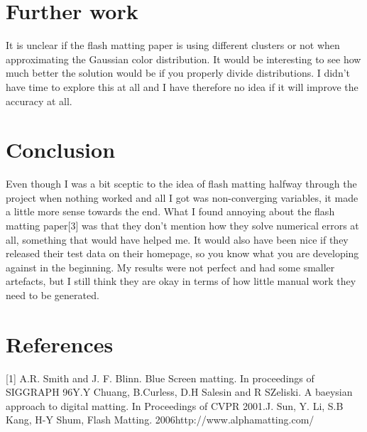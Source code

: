 \documentclass[10pt,letterpaper,twocolumn]{article}
\begin{document}
\section{Further work}
It is unclear if the flash matting paper is using different clusters or not when approximating the Gaussian color distribution. It would be interesting to see how much better the solution would be if you properly divide distributions. I didn't have time to explore this at all and I have therefore no idea if it will improve the accuracy at all.

\section{Conclusion}
Even though I was a bit sceptic to the idea of flash matting halfway through the project when nothing worked and all I got was non-converging variables, it made a little more sense towards the end. What I found annoying about the flash matting paper[3] was that they don't mention how they solve numerical errors at all, something that would have helped me. It would also have been nice if they released their test data on their homepage, so you know what you are developing against in the beginning. My results were not perfect and had some smaller artefacts, but I still think they are okay in terms of how little manual work they need to be generated.

\section{References}
[1] A.R. Smith and J. F. Blinn. Blue Screen matting. In proceedings of SIGGRAPH 96\newline \newline
[2] Y.Y Chuang, B.Curless, D.H Salesin and R SZeliski. A baeysian approach to digital matting. In Proceedings of CVPR 2001.\newline \newline
[3] J. Sun, Y. Li, S.B Kang, H-Y Shum, Flash Matting. 2006\newline \newline
[4] http://www.alphamatting.com/
\end{document}
